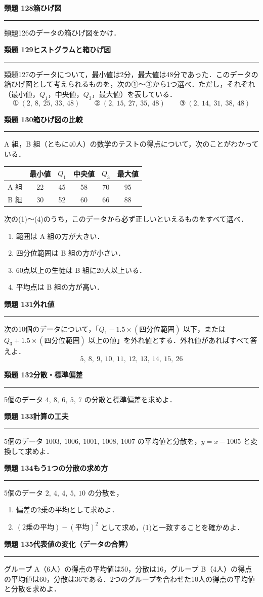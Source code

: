 \documentclass[a4paper,11pt]{ltjsarticle}
\newcommand{\mon}[2]{\Needspace{7\baselineskip}\vspace{10pt}%
  {\sffamily\bfseries 類題 #1\quad #2\par}\vspace{2pt}\hrule\vspace{4pt}}
\begin{document}
\mon{128}{箱ひげ図}
類題126のデータの箱ひげ図をかけ．

\mon{129}{ヒストグラムと箱ひげ図}
類題127のデータについて，最小値は2分，最大値は48分であった．このデータの箱ひげ図として考えられるものを，次の①〜③から1つ選べ．ただし，それぞれ（最小値，$Q_1$，中央値，$Q_3$，最大値）を表している．
\[\text{①}\ (2,\ 8,\ 25,\ 33,\ 48)\qquad\text{②}\ (2,\ 15,\ 27,\ 35,\ 48)\qquad\text{③}\ (2,\ 14,\ 31,\ 38,\ 48)\]

\mon{130}{箱ひげ図の比較}
A 組，B 組（ともに40人）の数学のテストの得点について，次のことがわかっている．
\begin{center}
\renewcommand{\arraystretch}{1.15}
\begin{tabular}{c|ccccc}
 & 最小値 & $Q_1$ & 中央値 & $Q_3$ & 最大値\\ \hline
A 組 & 22 & 45 & 58 & 70 & 95\\
B 組 & 30 & 52 & 60 & 66 & 88
\end{tabular}
\end{center}
次の(1)〜(4)のうち，このデータから必ず正しいといえるものをすべて選べ．
\begin{enumerate}
\item 範囲は A 組の方が大きい．
\item 四分位範囲は B 組の方が小さい．
\item 60点以上の生徒は B 組に20人以上いる．
\item 平均点は B 組の方が高い．
\end{enumerate}

\mon{131}{外れ値}
次の10個のデータについて，「$Q_1-1.5\times(\text{四分位範囲})$ 以下，または $Q_3+1.5\times(\text{四分位範囲})$ 以上の値」を外れ値とする．外れ値があればすべて答えよ．
\[5,\ 8,\ 9,\ 10,\ 11,\ 12,\ 13,\ 14,\ 15,\ 26\]

\mon{132}{分散・標準偏差}
5個のデータ $4,\ 8,\ 6,\ 5,\ 7$ の分散と標準偏差を求めよ．

\mon{133}{計算の工夫}
5個のデータ $1003,\ 1006,\ 1001,\ 1008,\ 1007$ の平均値と分散を，$y=x-1005$ と変換して求めよ．

\mon{134}{もう1つの分散の求め方}
5個のデータ $2,\ 4,\ 4,\ 5,\ 10$ の分散を，
\begin{enumerate}
\item 偏差の2乗の平均として求めよ．
\item $(\text{2乗の平均})-(\text{平均})^2$ として求め，(1)と一致することを確かめよ．
\end{enumerate}

\mon{135}{代表値の変化（データの合算）}
グループ A（6人）の得点の平均値は50，分散は16，グループ B（4人）の得点の平均値は60，分散は36である．2つのグループを合わせた10人の得点の平均値と分散を求めよ．
\end{document}
